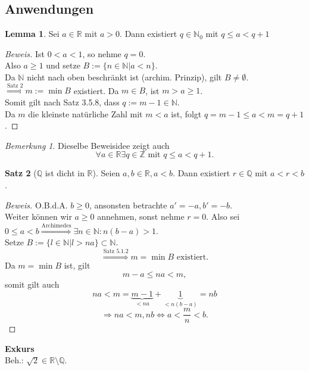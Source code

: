 \documentclass[12pt,a4paper,titlepage]{article} %
\theoremstyle{definition}
\newtheorem{satz}{Satz}[subsection]
\newtheorem{lem}[satz]{Lemma}
\theoremstyle{remark}
\newtheorem*{bem}{Bemerkung}
\newenvironment{bew}{\begin{proof}[Beweis]}{\end{proof}}
\begin{document}
\subsection{Anwendungen}
\begin{lem}
	Sei $a\in\mathbb{R}$ mit $a>0$. Dann existiert $q\in\mathbb{N}_0$ mit $q\leq a<q+1$
\end{lem}
\begin{bew}
	Ist $0<a<1$, so nehme $q = 0$.\\
	Also $a\geq 1$ und setze $B:=\{n\in\mathbb{N}|a<n\}$.\\
	Da $\mathbb{N}$ nicht nach oben beschränkt ist (archim. Prinzip), gilt $B\neq \emptyset$.\\
	$\overset{\text{Satz 2}}{\Rightarrow} m:=\min B$ existiert. Da $m\in B$, ist $m> a \geq 1$.\\
	Somit gilt nach Satz 3.5.8, dass $q:= m-1\in\mathbb{N}$.\\
	Da $m$ die kleinste natürliche Zahl mit $m<a$ ist, folgt $q = m-1 \leq a < m = q+1$.
\end{bew}
\begin{bem}
	Dieselbe Beweisidee zeigt auch $$\forall a\in\mathbb{R}\exists q\in\mathbb{Z} \text{ mit } q\leq a<q+1.$$
\end{bem}
\begin{satz}[$\mathbb{Q}$ ist dicht in $\mathbb{R}$]
	Seien $a,b\in\mathbb{R}, a<b$. Dann existiert $r\in\mathbb{Q}$ mit $a<r<b$.
\end{satz}
\begin{bew}
	O.B.d.A. $b\geq 0$, ansonsten betrachte $a'=-a, b'=-b$.\\
	Weiter können wir $a\geq 0$ annehmen, sonst nehme $r=0$.
	Also sei $0\leq a <b \overset{\text{Archimedes}}{\Rightarrow} \exists n\in\mathbb{N}: n(b-a)>1$.\\
	Setze $B:=\{l\in\mathbb{N}|l>na\} \subset \mathbb{N}$.
	$$\overset{\text{Satz 5.1.2}}{\Rightarrow} m = \min B \text{ existiert}.$$
	Da $m=\min B$ ist, gilt $$m -a\leq na<m,$$ somit gilt auch $$na<m=\underbrace{m-1}_{<na}+\underbrace{1}_{<n(b-a)}=nb$$
	$$\Rightarrow na<m,nb \Leftrightarrow a<\frac{m}{n}<b.$$
\end{bew}
\textbf{Exkurs}\\
Beh.: $\sqrt{2}\in\mathbb{R}\setminus \mathbb{Q}.$
\end{document}

